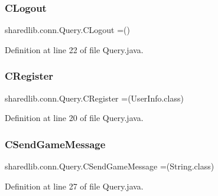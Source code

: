 \hypertarget{enumsharedlib_1_1conn_1_1_query_afc2a083454cba81038adceb4cd48ecf2}{}\label{enumsharedlib_1_1conn_1_1_query_afc2a083454cba81038adceb4cd48ecf2} 
\subsubsection{\texorpdfstring{C\+Logout}{CLogout}}
{\footnotesize\ttfamily sharedlib.\+conn.\+Query.\+C\+Logout =()}



Definition at line 22 of file Query.\+java.

\hypertarget{enumsharedlib_1_1conn_1_1_query_a8642336ee80fc5ec0f02531f64b94fbe}{}\label{enumsharedlib_1_1conn_1_1_query_a8642336ee80fc5ec0f02531f64b94fbe} 
\subsubsection{\texorpdfstring{C\+Register}{CRegister}}
{\footnotesize\ttfamily sharedlib.\+conn.\+Query.\+C\+Register =(User\+Info.\+class)}



Definition at line 20 of file Query.\+java.

\hypertarget{enumsharedlib_1_1conn_1_1_query_a815b1d848b33445e9489f6da81e91e73}{}\label{enumsharedlib_1_1conn_1_1_query_a815b1d848b33445e9489f6da81e91e73} 
\subsubsection{\texorpdfstring{C\+Send\+Game\+Message}{CSendGameMessage}}
{\footnotesize\ttfamily sharedlib.\+conn.\+Query.\+C\+Send\+Game\+Message =(String.\+class)}



Definition at line 27 of file Query.\+java.

\hypertarget{enumsharedlib_1_1conn_1_1_query_a67eb88813c5eca451aaea113583641a5}{}\label{enumsharedlib_1_1conn_1_1_query_a67eb88813c5eca451aaea113583641a5} 
